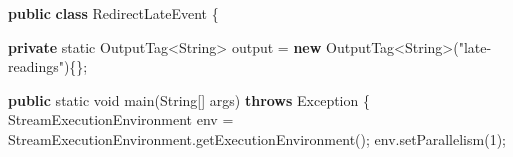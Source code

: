 \documentclass[cn,11pt,chinese]{elegantbook}
\newenvironment{Shaded}{}{}
\newcommand{\BuiltInTok}[1]{#1}
\newcommand{\DataTypeTok}[1]{\textcolor[rgb]{0.56,0.13,0.00}{#1}}
\newcommand{\DecValTok}[1]{\textcolor[rgb]{0.25,0.63,0.44}{#1}}
\newcommand{\FunctionTok}[1]{\textcolor[rgb]{0.02,0.16,0.49}{#1}}
\newcommand{\KeywordTok}[1]{\textcolor[rgb]{0.00,0.44,0.13}{\textbf{#1}}}
\newcommand{\NormalTok}[1]{#1}
\newcommand{\StringTok}[1]{\textcolor[rgb]{0.25,0.44,0.63}{#1}}
\begin{document}
\begin{Shaded}
\begin{Highlighting}[]
\KeywordTok{public} \KeywordTok{class}\NormalTok{ RedirectLateEvent \{}

    \KeywordTok{private} \DataTypeTok{static}\NormalTok{ OutputTag\textless{}}\BuiltInTok{String}\NormalTok{\textgreater{} output = }\KeywordTok{new}\NormalTok{ OutputTag\textless{}}\BuiltInTok{String}\NormalTok{\textgreater{}(}\StringTok{"late{-}readings"}\NormalTok{)\{\};}

    \KeywordTok{public} \DataTypeTok{static} \DataTypeTok{void} \FunctionTok{main}\NormalTok{(}\BuiltInTok{String}\NormalTok{[] args) }\KeywordTok{throws} \BuiltInTok{Exception}\NormalTok{ \{}
\NormalTok{        StreamExecutionEnvironment env = StreamExecutionEnvironment.}\FunctionTok{getExecutionEnvironment}\NormalTok{();}
\NormalTok{        env.}\FunctionTok{setParallelism}\NormalTok{(}\DecValTok{1}\NormalTok{);}


\end{Highlighting}
\end{Shaded}
\end{document}
